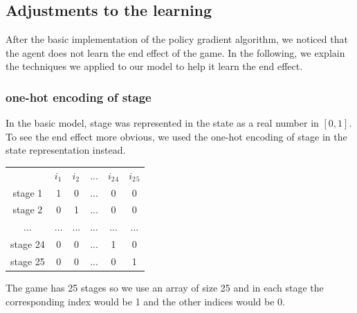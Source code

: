 \documentclass[a4paper,12pt]{article}  %
\theoremstyle{definition}
\begin{document}
\subsection{Adjustments to the learning}
	After the basic implementation of the policy gradient algorithm, we noticed that the agent does not learn the end effect of the game. In the following, we explain the techniques we applied to our model to help it learn the end effect.
	\subsubsection{one-hot encoding of stage}
	In the basic model, stage was represented in the state as a real number in $ [0,1] $. To see the end effect more obvious, we used the one-hot encoding of stage in the state representation instead. 
	
	\begin{table}[!h]
		\centering
		
		\begin{tabular}{p{}p{}p{}p{}p{}p{}}
			& $\displaystyle i_{1}$ & $\displaystyle i_{2}$ & ... & $\displaystyle i_{2}{}_{4}$ & $\displaystyle i_{2}{}_{5}$ \\
			\cline{2-6} 
			\multicolumn{1}{c|}{stage 1} & \multicolumn{1}{c|}{1} & \multicolumn{1}{c|}{0} & \multicolumn{1}{c|}{...} & \multicolumn{1}{c|}{0} & \multicolumn{1}{c|}{0} \\
			\cline{2-6} 
			\multicolumn{1}{c|}{stage 2} & \multicolumn{1}{c|}{0} & \multicolumn{1}{c|}{1} & \multicolumn{1}{c|}{...} & \multicolumn{1}{c|}{0} & \multicolumn{1}{c|}{0} \\
			\cline{2-6} 
			\multicolumn{1}{c|}{...} & \multicolumn{1}{c|}{...} & \multicolumn{1}{c|}{...} & \multicolumn{1}{c|}{...} & \multicolumn{1}{c|}{...} & \multicolumn{1}{c|}{...} \\
			\cline{2-6} 
			\multicolumn{1}{c|}{stage 24} & \multicolumn{1}{c|}{0} & \multicolumn{1}{c|}{0} & \multicolumn{1}{c|}{...} & \multicolumn{1}{c|}{1} & \multicolumn{1}{c|}{0} \\
			\cline{2-6} 
			\multicolumn{1}{c|}{stage 25} & \multicolumn{1}{c|}{0} & \multicolumn{1}{c|}{0} & \multicolumn{1}{c|}{...} & \multicolumn{1}{c|}{0} & \multicolumn{1}{c|}{1} \\
			\cline{2-6}
		\end{tabular}
		
	\end{table}
	The game has 25 stages so we use an array of size 25 and in each stage the corresponding index would be 1 and the other indices would be 0.
\end{document}
